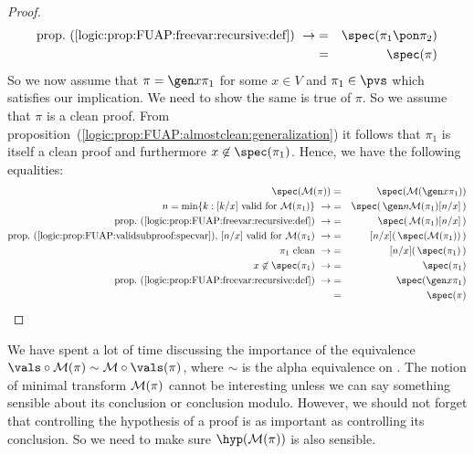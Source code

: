\begin{proof}
\begin{eqnarray*}
    \mbox{prop.~(\ref{logic:prop:FUAP:freevar:recursive:def})}\ \rightarrow
    &=&\spec(\pi_{1}\pon\pi_{2})\\
    &=&\spec(\pi)
    \end{eqnarray*}
So we now assume that $\pi=\gen x\pi_{1}$ for some $x\in V$ and
$\pi_{1}\in\pvs$ which satisfies our implication. We need to show
the same is true of $\pi$. So we assume that $\pi$ is a clean proof.
From proposition~(\ref{logic:prop:FUAP:almostclean:generalization})
it follows that $\pi_{1}$ is itself a clean proof and furthermore
$x\not\in\spec(\pi_{1})$. Hence, we have the following equalities:
    \begin{eqnarray*}
    \spec({\cal M}(\pi))&=&\spec({\cal M}(\gen x\pi_{1}))\\
    n=\min\{k:[k/x]\mbox{\ valid for\ }{\cal M}(\pi_{1})\}\
    \rightarrow
    &=&\spec(\,\gen n{\cal M}(\pi_{1})[n/x]\,)\\
    \mbox{prop.~(\ref{logic:prop:FUAP:freevar:recursive:def})}\ \rightarrow
    &=&\spec(\,{\cal M}(\pi_{1})[n/x]\,)\\
    \mbox{prop.~(\ref{logic:prop:FUAP:validsubproof:specvar}),
    $[n/x]$ valid for ${\cal M}(\pi_{1})$}\ \rightarrow
    &=&[n/x](\,\spec({\cal M}(\pi_{1}))\,)\\
    \mbox{$\pi_{1}$ clean}\ \rightarrow
    &=&[n/x](\,\spec(\pi_{1})\,)\\
    x\not\in\spec(\pi_{1})\ \rightarrow
    &=&\spec(\pi_{1})\\
    \mbox{prop.~(\ref{logic:prop:FUAP:freevar:recursive:def})}\ \rightarrow
    &=&\spec(\gen x\pi_{1})\\
    &=&\spec(\pi)
    \end{eqnarray*}
\end{proof}

We have spent a lot of time discussing the importance of the
equivalence $\vals\circ{\cal M}(\pi)\sim{\cal M}\circ\vals(\pi)$,
where $\sim$ is the alpha equivalence on \pvb. The notion of
minimal transform ${\cal M}(\pi)$ cannot be interesting unless we
can say something sensible about its conclusion or conclusion
modulo. However, we should not forget that controlling the
hypothesis of a proof is as important as controlling its conclusion.
So we need to make sure $\hyp({\cal M}(\pi))$ is also sensible.

